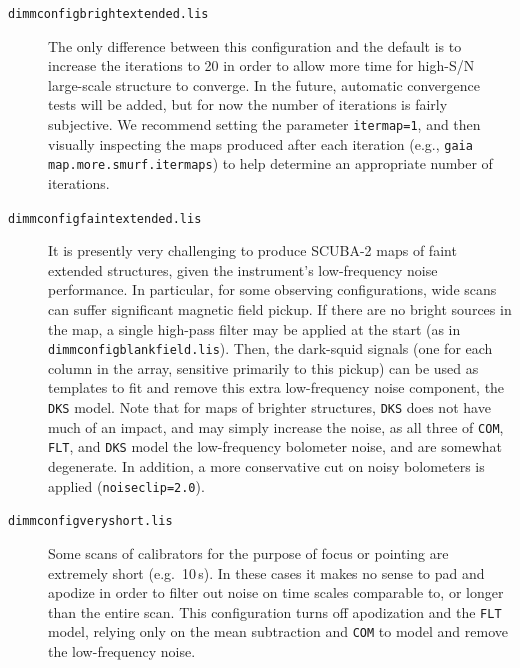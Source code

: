 \documentclass[twoside,11pt]{article}
\renewcommand{\_}{\texttt{\symbol{95}}}
\begin{document}
\begin{description}
\item[\texttt{dimmconfig\_bright\_extended.lis}]\quad The only
  difference between this configuration and the default is to increase
  the iterations to 20 in order to allow more time for high-S/N
  large-scale structure to converge. In the future, automatic
  convergence tests will be added, but for now the number of
  iterations is fairly subjective. We recommend setting the parameter
  \texttt{itermap=1}, and then visually inspecting the maps produced
  after each iteration (e.g., \texttt{gaia map.more.smurf.itermaps})
  to help determine an appropriate number of iterations.


\item[\texttt{dimmconfig\_faint\_extended.lis}]\quad It is presently
  very challenging to produce SCUBA-2 maps of faint extended
  structures, given the instrument's low-frequency noise
  performance. In particular, for some observing configurations, wide
  scans can suffer significant magnetic field pickup. If there are no
  bright sources in the map, a single high-pass filter may be applied
  at the start (as in \texttt{dimmconfig\_blank\_field.lis}). Then,
  the dark-squid signals (one for each column in the array, sensitive
  primarily to this pickup) can be used as templates to fit and remove
  this extra low-frequency noise component, the \texttt{DKS}
  model. Note that for maps of brighter structures, \texttt{DKS} does
  not have much of an impact, and may simply increase the noise, as
  all three of \texttt{COM}, \texttt{FLT}, and \texttt{DKS} model the
  low-frequency bolometer noise, and are somewhat degenerate.  In
  addition, a more conservative cut on noisy bolometers is applied
  (\texttt{noiseclip=2.0}).

\item[\texttt{dimmconfig\_veryshort.lis}]\quad Some scans of
  calibrators for the purpose of focus or pointing are extremely short
  (e.g.~10\,s). In these cases it makes no sense to pad and apodize in
  order to filter out noise on time scales comparable to, or longer
  than the entire scan. This configuration turns off apodization and
  the \texttt{FLT} model, relying only on the mean subtraction and
  \texttt{COM} to model and remove the low-frequency noise.


\end{description}
\end{document}
